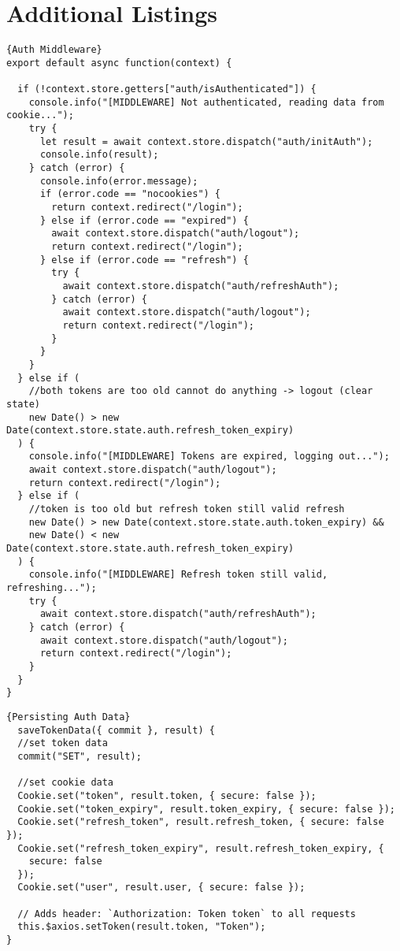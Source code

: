 \chapter{Additional Listings}

\begin{lstlisting}[caption=Auth Middleware, captionpos=b, style=htmlcssjs, label=authmiddleware]{Auth Middleware}
export default async function(context) {

  if (!context.store.getters["auth/isAuthenticated"]) {
    console.info("[MIDDLEWARE] Not authenticated, reading data from cookie...");
    try {
      let result = await context.store.dispatch("auth/initAuth");
      console.info(result);
    } catch (error) {
      console.info(error.message);
      if (error.code == "nocookies") {
        return context.redirect("/login");
      } else if (error.code == "expired") {
        await context.store.dispatch("auth/logout");
        return context.redirect("/login");
      } else if (error.code == "refresh") {
        try {
          await context.store.dispatch("auth/refreshAuth");
        } catch (error) {
          await context.store.dispatch("auth/logout");
          return context.redirect("/login");
        }
      }
    }
  } else if (
    //both tokens are too old cannot do anything -> logout (clear state)
    new Date() > new Date(context.store.state.auth.refresh_token_expiry)
  ) {
    console.info("[MIDDLEWARE] Tokens are expired, logging out...");
    await context.store.dispatch("auth/logout");
    return context.redirect("/login");
  } else if (
    //token is too old but refresh token still valid refresh
    new Date() > new Date(context.store.state.auth.token_expiry) &&
    new Date() < new Date(context.store.state.auth.refresh_token_expiry)
  ) {
    console.info("[MIDDLEWARE] Refresh token still valid, refreshing...");
    try {
      await context.store.dispatch("auth/refreshAuth");
    } catch (error) {
      await context.store.dispatch("auth/logout");
      return context.redirect("/login");
    }
  }
}
\end{lstlisting}

\newpage

\begin{lstlisting}[caption=Persisting Auth Data, captionpos=b, style=htmlcssjs, label=persauthdata]{Persisting Auth Data}
  saveTokenData({ commit }, result) {
  //set token data
  commit("SET", result);

  //set cookie data
  Cookie.set("token", result.token, { secure: false });
  Cookie.set("token_expiry", result.token_expiry, { secure: false });
  Cookie.set("refresh_token", result.refresh_token, { secure: false });
  Cookie.set("refresh_token_expiry", result.refresh_token_expiry, {
    secure: false
  });
  Cookie.set("user", result.user, { secure: false });

  // Adds header: `Authorization: Token token` to all requests
  this.$axios.setToken(result.token, "Token");
}
\end{lstlisting}

